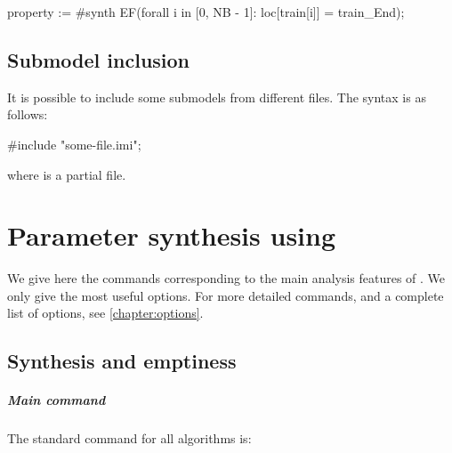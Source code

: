 \begin{IMITATORproperty}
property := #synth EF(forall i in [0, NB - 1]: loc[train[i]] = train_End);
\end{IMITATORproperty}



\section{Submodel inclusion}\label{section:include}

It is possible to include some submodels from different files.
The syntax is as follows:

\begin{IMITATORmodel}
#include "some-file.imi";
\end{IMITATORmodel}

\noindent{} where  is a partial \imitator{} file.


\chapter{Parameter synthesis using \imitator{}}\label{chapter:synthesis}


We give here the commands corresponding to the main analysis features of \imitator{}.
We only give the most useful options.
For more detailed commands, and a complete list of options, see \cref{chapter:options}.

\section{Synthesis and emptiness}

\paragraph{Main command}
The standard \imitator{} command for all algorithms is:


